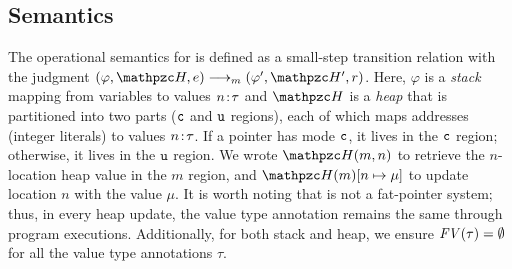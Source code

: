 \subsection{Semantics}\label{sec:semantics}



The operational semantics for \lang is defined as a small-step
transition relation with the judgment $ (\varphi,\heap,e)
\longrightarrow_m (\varphi',\heap',r)$. Here, $\varphi$ is a
\emph{stack} mapping from variables to values ${n}\!:\!{\tau}$ and
$\heap$ is a \emph{heap} that is partitioned into two parts ($\texttt{c}$ and $\texttt{u}$ regions), each of which
maps addresses (integer literals) to values ${n}\!:\!{\tau}$.
If a pointer has mode $\texttt{c}$, it lives in the $\texttt{c}$ region; otherwise, it lives in the $\texttt{u}$ region.
We wrote $\heap(m,n)$ to retrieve the $n$-location heap value in the $m$ region,
and $\heap(m)[n\mapsto \mu]$ to update location $n$ with the value $\mu$.
It is worth noting that \systemname is not a fat-pointer system;
thus, in every heap update, the value type annotation remains the same through program executions.
Additionally, for both stack and heap, 
we ensure $\mathit{FV}(\tau)=\emptyset$ for all the value type annotations $\tau$.

